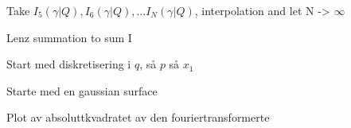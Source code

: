 \documentclass[../main.tex]{subfiles}
\begin{document}
Take $I_5(\gamma|Q), I_6(\gamma|Q), ... I_N(\gamma|Q)$, interpolation and let N -> $\infty$

Lenz summation to sum I

Start med diskretisering i $q$, så $p$ så $x_1$

Starte med en gaussian surface


Plot av absoluttkvadratet av den fouriertransformerte
\end{document}
